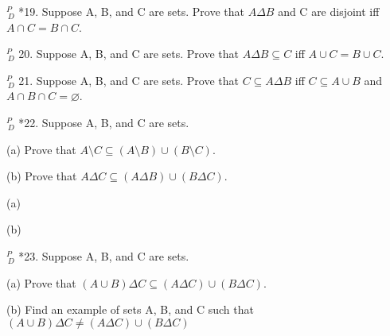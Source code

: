 \documentclass{article}
\begin{document}
\vspace{30pt}

$^{\textit{P}}_{\, \textit{D}}$ *19. Suppose A, B, and C are sets. Prove that $A \Delta B$ and C are disjoint iff
$A \cap C = B \cap C$.

\vspace{30pt}



\vspace{30pt}

$^{\textit{P}}_{\, \textit{D}}$ 20. Suppose A, B, and C are sets. Prove that $A \Delta B \subseteq C$ iff $A \cup C = B \cup C$.

\vspace{30pt}



\vspace{30pt}

$^{\textit{P}}_{\, \textit{D}}$ 21. Suppose A, B, and C are sets. Prove that $C \subseteq A \Delta B$ iff $C \subseteq A \cup B$ and $A \cap B \cap C = \varnothing$.

\vspace{30pt}



\vspace{30pt}

$^{\textit{P}}_{\, \textit{D}}$ *22. Suppose A, B, and C are sets.

\hspace{12pt}(a) Prove that $A \setminus C \subseteq (A \setminus B) \cup (B \setminus C)$.

\hspace{12pt}(b) Prove that $A \Delta C \subseteq (A \Delta B) \cup (B \Delta C)$.

\vspace{30pt}

(a)

\vspace{30pt}

(b)

\vspace{30pt}

$^{\textit{P}}_{\, \textit{D}}$ *23. Suppose A, B, and C are sets.

\hspace{12pt}(a) Prove that $(A \cup B) \Delta C \subseteq (A \Delta C) \cup (B \Delta C)$.

\hspace{12pt}(b) Find an example of sets A, B, and C such that $(A \cup B) \Delta C \neq
(A \Delta C) \cup (B \Delta C)$
\end{document}
